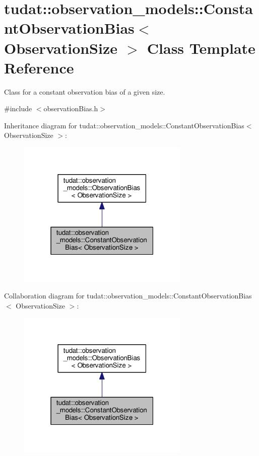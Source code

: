 \hypertarget{classtudat_1_1observation__models_1_1ConstantObservationBias}{}\section{tudat\+:\+:observation\+\_\+models\+:\+:Constant\+Observation\+Bias$<$ Observation\+Size $>$ Class Template Reference}
\label{classtudat_1_1observation__models_1_1ConstantObservationBias}


Class for a constant observation bias of a given size.  




{\ttfamily \#include $<$observation\+Bias.\+h$>$}



Inheritance diagram for tudat\+:\+:observation\+\_\+models\+:\+:Constant\+Observation\+Bias$<$ Observation\+Size $>$\+:
\nopagebreak
\begin{figure}[H]
\begin{center}
\leavevmode
\includegraphics[width=232pt]{classtudat_1_1observation__models_1_1ConstantObservationBias__inherit__graph}
\end{center}
\end{figure}


Collaboration diagram for tudat\+:\+:observation\+\_\+models\+:\+:Constant\+Observation\+Bias$<$ Observation\+Size $>$\+:
\nopagebreak
\begin{figure}[H]
\begin{center}
\leavevmode
\includegraphics[width=232pt]{classtudat_1_1observation__models_1_1ConstantObservationBias__coll__graph}
\end{center}
\end{figure}
